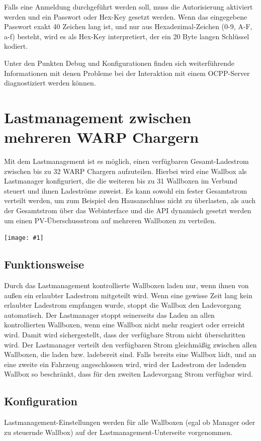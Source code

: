 \documentclass[a4paper,10pt]{article}
\newcommand{\gfx}[1]{\texttt{[image: \#1]}}
\begin{document}
\begin{multicols*}{2}
	Falls eine Anmeldung durchgeführt werden soll, muss die Autorisierung aktiviert werden
	und ein Passwort oder Hex-Key gesetzt werden. Wenn das eingegebene Passwort exakt 40 Zeichen lang ist,
	und nur aus Hexadezimal-Zeichen (0-9, A-F, a-f) besteht, wird es als Hex-Key interpretiert, der ein 20
	Byte langen Schlüssel kodiert.

	Unter den Punkten Debug und Konfigurationen finden sich weiterführende Informationen mit denen Probleme
	bei der Interaktion mit einem OCPP-Server diagnostiziert werden können.

	\newpage
	\section{Lastmanagement zwischen mehreren WARP Chargern}\label{charge_manager}
	Mit dem Lastmanagement ist es möglich, einen verfügbaren Gesamt-Ladestrom
	zwischen bis zu 32 WARP Chargern aufzuteilen. Hierbei wird eine Wallbox als
	Lastmanager konfiguriert, die die weiteren bis zu 31 Wallboxen im Verbund steuert und ihnen Ladeströme
	zuweist. Es kann sowohl ein fester Gesamtstrom verteilt werden, um zum Beispiel den Hausanschluss nicht zu überlasten,
	als auch der Gesamtstrom über das Webinterface und die API dynamisch gesetzt werden
	um einen PV-Überschussstrom auf mehreren Wallboxen zu verteilen.

	\gfx{./img_warp2/resized/web_charge_manager}

	\subsection{Funktionsweise}
	Durch das Lastmanagement kontrollierte Wallboxen laden nur,
	wenn ihnen von außen ein erlaubter Ladestrom mitgeteilt wird. Wenn eine gewisse Zeit lang
	kein erlaubter Ladestrom empfangen wurde, stoppt die Wallbox den Ladevorgang automatisch.
	Der Lastmanager stoppt seinerseits das Laden an allen kontrollierten Wallboxen,
	wenn eine Wallbox nicht mehr reagiert oder erreicht wird. Damit wird sichergestellt,
	dass der verfügbare Strom nicht überschritten wird.
	Der Lastmanager verteilt den verfügbaren Strom gleichmäßig zwischen allen Wallboxen, die laden bzw. ladebereit sind.
	Falls bereits eine Wallbox lädt, und an eine zweite ein Fahrzeug angeschlossen wird,
	wird der Ladestrom der ladenden Wallbox so beschränkt, dass für den zweiten Ladevorgang Strom verfügbar wird.

	\subsection{Konfiguration}
	Lastmanagement-Einstellungen werden für alle Wallboxen (egal ob Manager oder zu steuernde Wallbox) auf der
	Lastmanagement-Unterseite vorgenommen.


\end{multicols*}
\end{document}
